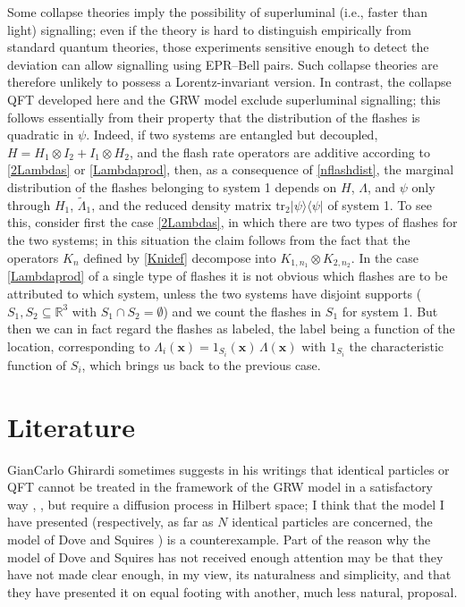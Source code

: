 \documentclass[12pt]{article}
\newcommand{\RRR}{\mathbb{R}}
\newcommand{\vx}{\boldsymbol{x}}
\newcommand{\1}{1}
\newcommand{\K}{K}
\newcommand{\z}[1]{{#1}}
\begin{document}
Some collapse theories imply the possibility of superluminal (i.e., faster than light) signalling; even if the theory is hard to distinguish empirically from standard quantum theories, those experiments sensitive enough to detect the deviation can allow signalling using EPR--Bell pairs. Such collapse theories are therefore unlikely to possess a Lorentz-invariant version. In contrast, the collapse QFT developed here and the GRW model exclude superluminal signalling; this follows essentially from their property that the distribution of the flashes is quadratic in $\psi$. Indeed, if two systems are entangled but decoupled, $H = H_{1} \otimes I_{2} + I_{1} \otimes H_{2}$, and the flash rate operators are additive according to \eqref{2Lambdas} or \eqref{Lambdaprod}, then, as a consequence of \eqref{nflashdist}, the marginal distribution of the flashes belonging to system 1 depends on $H$, $\Lambda$, and $\psi$ only through $H_{1}$, $\tilde\Lambda_{1}$, and the reduced density matrix $\mathrm{tr}_{2} |\psi \rangle \langle \psi|$ of system 1. \z{To see this, consider first the case \eqref{2Lambdas}, in which there are two types of flashes for the two systems; in this situation the claim follows from the fact that the operators $\K_n$ defined by \eqref{Knidef} decompose into $\K_{1,n_{1}} \otimes \K_{2,n_{2}}$. In the case \eqref{Lambdaprod} of a single type of flashes it is not obvious which flashes are to be attributed to which system, unless the two systems have disjoint supports ($S_1,S_2 \subseteq \RRR^3$ with $S_1 \cap S_2 = \emptyset$) and we count the flashes in $S_1$ for system 1. But then we can in fact regard the flashes as labeled, the label being a function of the location, corresponding to $\Lambda_i(\vx) = 1_{S_i}(\vx) \, \Lambda(\vx)$ with $1_{S_i}$ the characteristic function of $S_i$, which brings us back to the previous case.}



\section{Literature}

GianCarlo Ghirardi sometimes suggests in his writings that identical particles or QFT cannot be treated in the framework of the GRW model in a satisfactory way \cite[page~118]{Ghi98}, \cite[pages 312 and 382]{BG03}, but require a diffusion process in Hilbert space; I think that the model I have presented \z{(respectively, as far as $N$ identical particles are concerned, the model of Dove and Squires \cite{DS95})} is a counterexample. \z{Part of the reason why the model of Dove and Squires has not received enough attention may be that they have not made clear enough, in my view, its naturalness and simplicity, and that they have presented it on equal footing with another, much less natural, proposal.}
\end{document}
